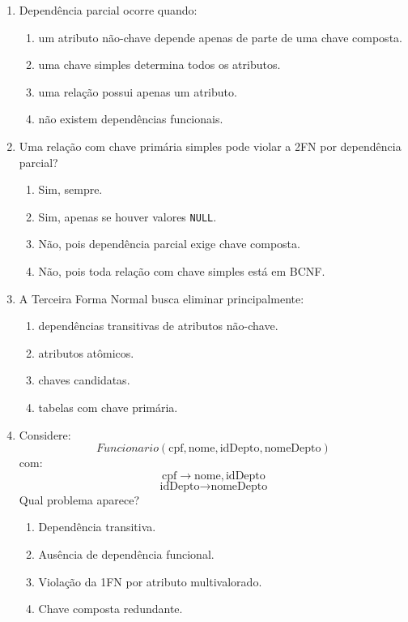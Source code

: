 \documentclass[12pt,a4paper]{article}
\begin{document}
\begin{enumerate}[label=\textbf{Q\arabic*.}]
\item Dependência parcial ocorre quando:

\begin{enumerate}[label=\alph*)]
    \item um atributo não-chave depende apenas de parte de uma chave composta.
    \item uma chave simples determina todos os atributos.
    \item uma relação possui apenas um atributo.
    \item não existem dependências funcionais.
\end{enumerate}

\item Uma relação com chave primária simples pode violar a 2FN por dependência parcial?

\begin{enumerate}[label=\alph*)]
    \item Sim, sempre.
    \item Sim, apenas se houver valores \texttt{NULL}.
    \item Não, pois dependência parcial exige chave composta.
    \item Não, pois toda relação com chave simples está em BCNF.
\end{enumerate}

\item A Terceira Forma Normal busca eliminar principalmente:

\begin{enumerate}[label=\alph*)]
    \item dependências transitivas de atributos não-chave.
    \item atributos atômicos.
    \item chaves candidatas.
    \item tabelas com chave primária.
\end{enumerate}

\item Considere:
\[
Funcionario(\text{cpf}, \text{nome}, \text{idDepto}, \text{nomeDepto})
\]
com:
\[
\text{cpf} \rightarrow \text{nome}, \text{idDepto}
\]
\[
\text{idDepto} \rightarrow \text{nomeDepto}
\]
Qual problema aparece?

\begin{enumerate}[label=\alph*)]
    \item Dependência transitiva.
    \item Ausência de dependência funcional.
    \item Violação da 1FN por atributo multivalorado.
    \item Chave composta redundante.
\end{enumerate}


\end{enumerate}
\end{document}
